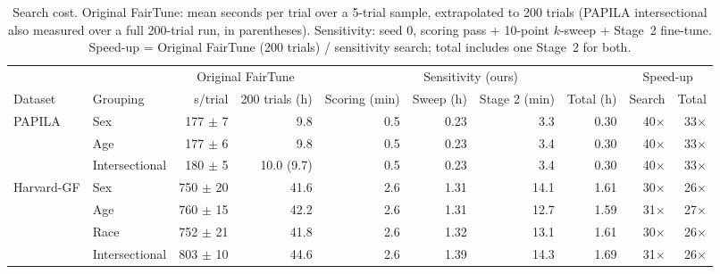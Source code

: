 \begin{table}[t]
\centering
\caption{Search cost. Original FairTune: mean seconds per trial over a 5-trial sample, extrapolated to 200 trials (PAPILA intersectional also measured over a full 200-trial run, in parentheses). Sensitivity: seed 0, scoring pass + 10-point $k$-sweep + Stage~2 fine-tune. Speed-up = Original FairTune (200 trials) / sensitivity search; total includes one Stage~2 for both.}
\label{tab:compute}
\small
\begin{tabular}{llrrrrrrrr}
\toprule
 & & \multicolumn{2}{c}{Original FairTune} & \multicolumn{4}{c}{Sensitivity (ours)} & \multicolumn{2}{c}{Speed-up} \\
\cmidrule(lr){3-4}\cmidrule(lr){5-8}\cmidrule(lr){9-10}
Dataset & Grouping & s/trial & 200 trials (h) & Scoring (min) & Sweep (h) & Stage 2 (min) & Total (h) & Search & Total \\
\midrule
PAPILA & Sex & 177 $\pm$ 7 & 9.8 & 0.5 & 0.23 & 3.3 & 0.30 & 40$\times$ & 33$\times$ \\
 & Age & 177 $\pm$ 6 & 9.8 & 0.5 & 0.23 & 3.4 & 0.30 & 40$\times$ & 33$\times$ \\
 & Intersectional & 180 $\pm$ 5 & 10.0 (9.7) & 0.5 & 0.23 & 3.4 & 0.30 & 40$\times$ & 33$\times$ \\
\midrule
Harvard-GF & Sex & 750 $\pm$ 20 & 41.6 & 2.6 & 1.31 & 14.1 & 1.61 & 30$\times$ & 26$\times$ \\
 & Age & 760 $\pm$ 15 & 42.2 & 2.6 & 1.31 & 12.7 & 1.59 & 31$\times$ & 27$\times$ \\
 & Race & 752 $\pm$ 21 & 41.8 & 2.6 & 1.32 & 13.1 & 1.61 & 30$\times$ & 26$\times$ \\
 & Intersectional & 803 $\pm$ 10 & 44.6 & 2.6 & 1.39 & 14.3 & 1.69 & 31$\times$ & 26$\times$ \\
\bottomrule
\end{tabular}
\end{table}
